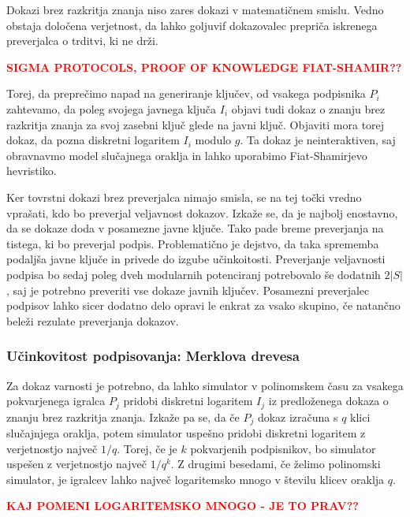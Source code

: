 \documentclass[isrm2, tisk]{fmfdelo}
\newcommand{\todo}[1]{\textcolor{red}{\textbf{\uppercase{#1}??}}}
\begin{document}
\begin{opomba}
    Dokazi brez razkritja znanja niso zares dokazi v matematičnem smislu. Vedno obstaja določena verjetnost, 
    da lahko goljuvif dokazovalec prepriča iskrenega preverjalca o trditvi, ki ne drži.
\end{opomba}

\todo{sigma protocols, proof of knowledge fiat-shamir}

Torej, da preprečimo napad na generiranje ključev, od vsakega podpisnika $P_i$ zahtevamo, da poleg 
svojega javnega ključa $I_i$ objavi tudi dokaz o znanju brez razkritja znanja za svoj zasebni ključ 
glede na javni ključ. Objaviti mora torej dokaz, da pozna diskretni logaritem $I_i$ modulo $g$. 
Ta dokaz je neinteraktiven, saj obravnavmo model slučajnega oraklja in lahko uporabimo Fiat-Shamirjevo 
hevristiko.

Ker tovrstni dokazi brez preverjalca nimajo smisla, se na tej točki vredno vprašati, kdo bo preverjal 
veljavnost dokazov. Izkaže se, da je najbolj enostavno, da se dokaze doda v posamezne javne ključe. 
Tako pade breme preverjanja na tistega, ki bo preverjal podpis. Problematično je dejstvo, da taka 
sprememba podaljša javne ključe in privede do izgube učinkoitosti. Preverjanje veljavnosti podpisa 
bo sedaj poleg dveh modularnih potenciranj potrebovalo še dodatnih $2|S|$, saj je potrebno preveriti 
vse dokaze javnih ključev. Posamezni preverjalec podpisov lahko sicer dodatno delo opravi le enkrat 
za vsako skupino, če natančno beleži rezulate preverjanja dokazov.

\subsubsection{Učinkovitost podpisovanja: Merklova drevesa}
Za dokaz varnosti je potrebno, da lahko simulator v polinomskem času za vsakega pokvarjenega igralca $P_j$
pridobi diskretni logaritem $I_j$ iz predloženega dokaza o znanju brez razkritja znanja. Izkaže pa se, 
da če $P_j$ dokaz izračuna s $q$ klici slučajnjega oraklja, potem simulator uspešno pridobi diskretni 
logaritem z verjetnostjo največ $1/q$. Torej, če je $k$ pokvarjenih podpisnikov, bo simulator 
uspešen z verjetnostjo največ $1/q^k$. Z drugimi besedami, če želimo polinomski simulator, je 
igralcev lahko največ logaritemsko mnogo v številu klicev oraklja $q$.

\todo{kaj pomeni logaritemsko mnogo - je to prav}
\end{document}
